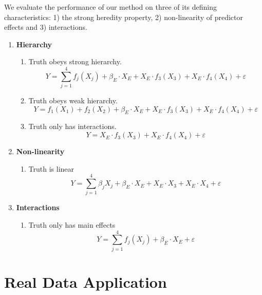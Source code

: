 \documentclass[12pt,letter]{article}\usepackage[]{graphicx}\usepackage[]{color}
\begin{document}
We evaluate the performance of our method on three of its defining characteristics: 1) the strong heredity property, 2) non-linearity of predictor effects and 3) interactions.


\begin{enumerate}
	\item \textbf{Hierarchy}
	\begin{enumerate}
		\item Truth obeys strong hierarchy. \[Y = \sum_{j=1}^{4} f_j(X_{j}) + \beta_E \cdot X_{E} +  X_{E} \cdot f_3(X_{3}) + X_{E} \cdot f_4(X_{4}) + \varepsilon\]
		\item Truth obeys weak hierarchy.
		\[Y = f_1(X_{1}) + f_2(X_{2}) + \beta_E \cdot X_{E} +  X_{E} \cdot f_3(X_{3}) + X_{E} \cdot f_4(X_{4}) + \varepsilon\]
		\item Truth only has interactions.  \[Y =  X_{E} \cdot f_3(X_{3}) + X_{E} \cdot f_4(X_{4}) + \varepsilon\]
	\end{enumerate}
	
	\item \textbf{Non-linearity}
	\begin{enumerate}
		\item Truth is linear \[Y = \sum_{j=1}^{4}\beta_j X_{j} + \beta_E \cdot X_{E} +  X_{E} \cdot X_{3} + X_{E} \cdot X_{4} + \varepsilon\]
	\end{enumerate}
	
	\item \textbf{Interactions}
	\begin{enumerate}
		
		\item Truth only has main effects  \[Y = \sum_{j=1}^{4} f_j(X_{j}) + \beta_E \cdot X_{E} + \varepsilon\]
	\end{enumerate}
	
	
\end{enumerate}



\section{Real Data Application}






\newpage
%

%

\end{document}
